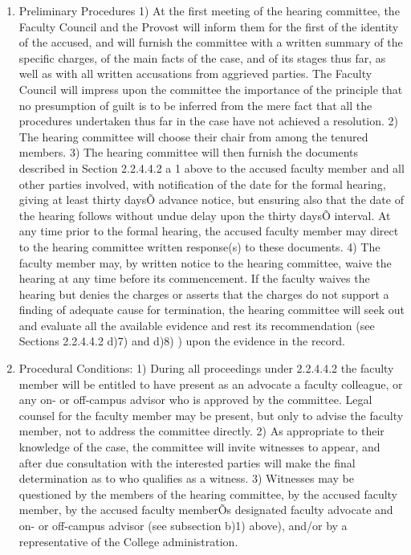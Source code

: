 \documentclass[letterpaper, 11pt]{article}
\begin{document}
				\begin{enumerate}[label=\alph*)]
					\item{Preliminary Procedures}
					1) At the first meeting of the hearing committee, the Faculty Council and the Provost will inform them for the first of the identity of the accused, and will furnish the committee with a written summary of the specific charges, of the main facts of the case, and of its stages thus far, as well as with all written accusations from aggrieved parties. The Faculty Council will impress upon the committee the importance of the principle that no presumption of guilt is to be inferred from the mere fact that all the procedures undertaken thus far in the case have not achieved a resolution.
					2) The hearing committee will choose their chair from among the tenured members.
					3) The hearing committee will then furnish the documents described in Section 2.2.4.4.2 a 1 above to the accused faculty member and all other parties involved, with notification of the date for the formal hearing, giving at least thirty daysÕ advance notice, but ensuring also that the date of the hearing follows without undue delay upon the thirty daysÕ interval.  At any time prior to the formal hearing, the accused faculty member may direct to the hearing committee written response(s) to these documents.
					4) The faculty member may, by written notice to the hearing committee, waive the hearing at any time before its commencement.  If the faculty waives the hearing but denies the charges or asserts that the charges do not support a finding of adequate cause for termination, the hearing committee will seek out and evaluate all the available evidence and rest its recommendation (see Sections 2.2.4.4.2 d)7) and d)8) ) upon the evidence in the record.
					\item{Procedural Conditions:}
					1) During all proceedings under 2.2.4.4.2 the faculty member will be entitled to have present as an advocate a faculty colleague, or any on- or off-campus advisor who is approved by the committee.  Legal counsel for the faculty member may be present, but only to advise the faculty member, not to address the committee directly.
					2) As appropriate to their knowledge of the case, the committee will invite witnesses to appear, and after due consultation with the interested parties will make the final determination as to who qualifies as a witness.
					3) Witnesses may be questioned by the members of the hearing committee, by the accused faculty member, by the accused faculty memberÕs designated faculty advocate and on- or off-campus advisor (see subsection b)1) above), and/or by a representative of the College administration.

\end{enumerate}
\end{document}
